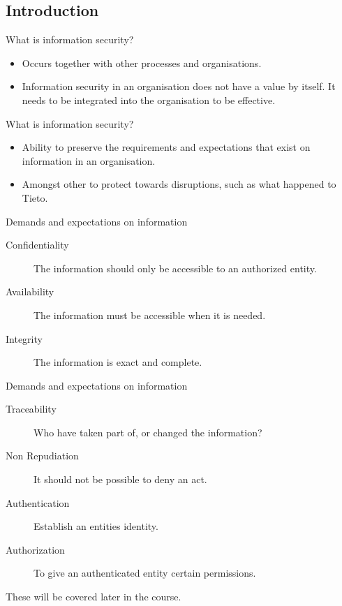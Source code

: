 \documentclass{beamer}
\begin{document}
\subsection{Introduction}

\begin{frame}{What is information security?}
  \begin{itemize}
    \item Occurs together with other processes and organisations.

    \item Information security in an organisation does not have a value by
      itself. It needs to be integrated into the organisation to be effective.

  \end{itemize}
\end{frame}

\begin{frame}{What is information security?}
  \begin{itemize}
    \item Ability to preserve the requirements and expectations that exist on
      information in an organisation.

    \item Amongst other to protect towards disruptions, such as what happened to
      Tieto.

  \end{itemize}
\end{frame}

\begin{frame}{Demands and expectations on information}
  \begin{description}
    \item[Confidentiality] The information should only be accessible to an
      authorized entity.

    \item[Availability] The information must be accessible when it is needed.

    \item[Integrity] The information is exact and complete.

  \end{description}
\end{frame}

\begin{frame}{Demands and expectations on information}
  \begin{description}
    \item[Traceability] Who have taken part of, or changed the information?
    \item[Non Repudiation] It should not be possible to deny an act.
    \item[Authentication] Establish an entities identity.
    \item[Authorization] To give an authenticated entity certain permissions.
  \end{description}
  These will be covered later in the course.
\end{frame}
\end{document}
